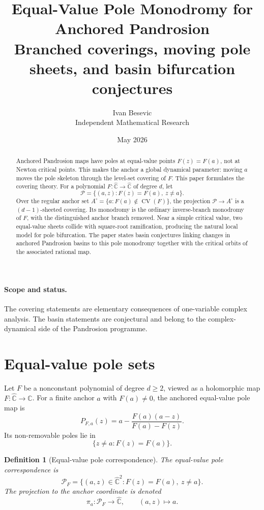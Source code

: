 \documentclass[11pt]{article}
\title{Equal-Value Pole Monodromy for Anchored Pandrosion\\[3pt]
\large Branched coverings, moving pole sheets, and basin bifurcation conjectures}
\author{Ivan Besevic\\Independent Mathematical Research}
\date{May 2026}
\newtheorem{definition}{Definition}[section]
\newcommand{\Chat}{\widehat{\mathbb C}}
\DeclareMathOperator{\CV}{CV}
\begin{document}
\maketitle

\begin{abstract}
Anchored Pandrosion maps have poles at equal-value points \(F(z)=F(a)\), not at Newton critical points. This makes the anchor a global dynamical parameter: moving \(a\) moves the pole skeleton through the level-set covering of \(F\). This paper formulates the covering theory. For a polynomial \(F:\Chat\to\Chat\) of degree \(d\), let
\[
        \mathcal P=\{(a,z):F(z)=F(a),\ z\ne a\}.
\]
Over the regular anchor set \(A^\circ=\{a:F(a)\notin \CV(F)\}\), the projection \(\mathcal P\to A^\circ\) is a \((d-1)\)-sheeted covering. Its monodromy is the ordinary inverse-branch monodromy of \(F\), with the distinguished anchor branch removed. Near a simple critical value, two equal-value sheets collide with square-root ramification, producing the natural local model for pole bifurcation. The paper states basin conjectures linking changes in anchored Pandrosion basins to this pole monodromy together with the critical orbits of the associated rational map.
\end{abstract}

\paragraph{Scope and status.}
The covering statements are elementary consequences of one-variable complex analysis. The basin statements are conjectural and belong to the complex-dynamical side of the Pandrosion programme.

\section{Equal-value pole sets}

Let \(F\) be a nonconstant polynomial of degree \(d\ge2\), viewed as a holomorphic map \(F:\Chat\to\Chat\). For a finite anchor \(a\) with \(F(a)\ne0\), the anchored equal-value pole map is
\[
        P_{F,a}(z)=a-\frac{F(a)(a-z)}{F(a)-F(z)}.
\]
Its non-removable poles lie in
\[
        \{z\ne a:F(z)=F(a)\}.
\]

\begin{definition}[Equal-value pole correspondence]
The equal-value pole correspondence is
\[
        \mathcal P_F=\{(a,z)\in\Chat^2:F(z)=F(a),\ z\ne a\}.
\]
The projection to the anchor coordinate is denoted
\[
        \pi_a:\mathcal P_F\to\Chat,\qquad (a,z)\mapsto a.
\]
\end{definition}
\end{document}
